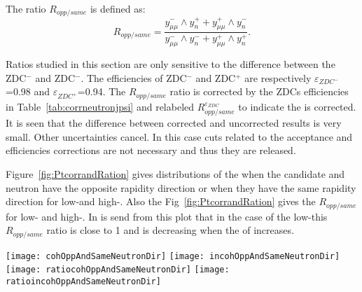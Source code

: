     The ratio $R_{opp/same}$ is defined as: 
    \begin{equation}
      R_{opp/same} = \frac{y^{-}_{\mu\mu} \wedge y_{n}^{+} + y^{+}_{\mu\mu} 
        \wedge y_{n}^{-}}{y^{-}_{\mu\mu} \wedge y_{n}^{-} + y^{+}_{\mu\mu} 
        \wedge y_{n}^{+}}.
    \end{equation}
    
    Ratios studied in this section are only sensitive to the difference between
      the ZDC$^{-}$ and ZDC$^{-}$.
    The efficiencies of ZDC$^{-}$ and ZDC$^{+}$ are respectively 
      $\varepsilon_{ZDC^{-}}$=0.98 and  $\varepsilon_{ZDC^{+}}$=0.94.
    The $R_{opp/same}$ ratio is corrected by the ZDCs efficiencies in 
      Table~\ref{tab:corrneutronjpsi} and relabeled 
      $R_{opp/same}^{\varepsilon_{ZDC}}$ to indicate the is corrected. 
    It is seen that the difference between corrected and uncorrected results is
      very small. 
    Other uncertainties cancel. 
    In this case cuts related to the acceptance and efficiencies corrections 
      are not necessary and thus they are released.
    
    Figure~\ref{fig:PtcorrandRation} gives \pt distributions of the \JPsi 
      when the \JPsi{} candidate and neutron have the opposite rapidity 
      direction or when they have the same rapidity direction for low-\pt and 
      high-\pt \JPsi{}. 
    Also the Fig~\ref{fig:PtcorrandRation} gives the $R_{opp/same}$ for low-\pt
      and high-\pt \JPsi. 
    In is send from this plot that in the case of the low-\pt \JPsi this 
      $R_{opp/same}$ ratio is close to 1 and is decreasing when the \pt of
      \JPsi{} increases.
    \begin{figure*}[!Hhtb]
      \begin{center}
        \texttt{[image: cohOppAndSameNeutronDir]}
        \texttt{[image: incohOppAndSameNeutronDir]} \\
        \texttt{[image: ratiocohOppAndSameNeutronDir]}
        \texttt{[image: ratioincohOppAndSameNeutronDir]}
      \caption{ \label{fig:PtcorrandRation}  
        Transverse momentum distribution of the $J/\psi$ when  $J/\psi$ and 
          neutron have the opposite rapidity direction and the transverse 
          momentum distribution of the $J/\psi$ when  $J/\psi$ and neutron
          have the same rapidity direction for low-\pt (top left) and 
          high-\pt (top right) \JPsi. Bottom: Ratios $R_{opp/same}$ for 
          low-\pt ( left) and high-\pt ( right) \JPsi.}
      \end{center}
    \end{figure*}
    
